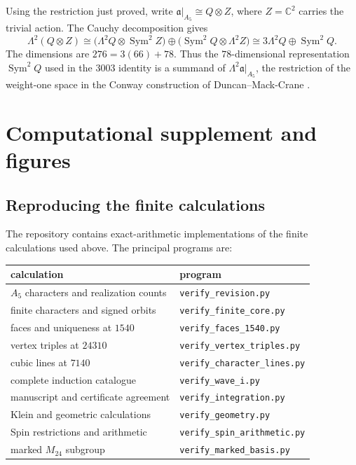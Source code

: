 \documentclass[11pt,a4paper]{article}
\begin{document}
Using the restriction just proved, write \(\mathfrak a|_{A_5}\cong Q\otimes Z\), where \(Z=\mathbb C^2\) carries the trivial action. The Cauchy decomposition gives
\[
\Lambda^2(Q\otimes Z)
\cong
\bigl(\Lambda^2Q\otimes\operatorname{Sym}^2Z\bigr)
\oplus
\bigl(\operatorname{Sym}^2Q\otimes\Lambda^2Z\bigr)
\cong 3\Lambda^2Q\oplus\operatorname{Sym}^2Q.
\]
The dimensions are \(276=3(66)+78\). Thus the \(78\)-dimensional representation \(\operatorname{Sym}^2Q\) used in the \(3003\) identity is a summand of \(\Lambda^2\mathfrak a|_{A_5}\), the restriction of the weight-one space in the Conway construction of Duncan--Mack-Crane \citep{DuncanMackCrane2015}.

\section{Computational supplement and figures}\label{sec:reproducibility}

\subsection{Reproducing the finite calculations}\label{subsec:I1}

The repository contains exact-arithmetic implementations of the finite calculations used above. The principal programs are:

\begin{center}
\begin{tabular}{ll}
\toprule
calculation & program\\
\midrule
\(A_5\) characters and realization counts & \texttt{verify\_revision.py}\\
finite characters and signed orbits & \texttt{verify\_finite\_core.py}\\
faces and uniqueness at \(1540\) & \texttt{verify\_faces\_1540.py}\\
vertex triples at \(24310\) & \texttt{verify\_vertex\_triples.py}\\
cubic lines at \(7140\) & \texttt{verify\_character\_lines.py}\\
complete induction catalogue & \texttt{verify\_wave\_i.py}\\
manuscript and certificate agreement & \texttt{verify\_integration.py}\\
Klein and geometric calculations & \texttt{verify\_geometry.py}\\
Spin restrictions and arithmetic & \texttt{verify\_spin\_arithmetic.py}\\
marked \(M_{24}\) subgroup & \texttt{verify\_marked\_basis.py}\\
\bottomrule
\end{tabular}
\end{center}
\end{document}
